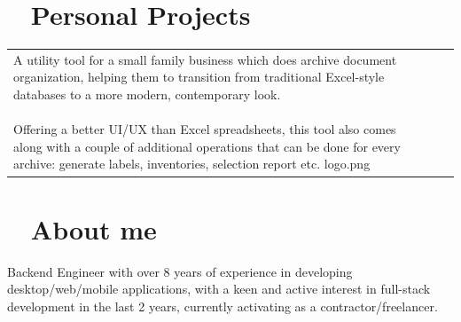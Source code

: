 \documentclass{modernsimplecv}
\newlength{\rightcolwidth}
\begin{document}
\begin{paracol}{2}
{\begin{minipage}[t]{\rightcolwidth}
        \end{minipage}
    
    }
        \switchcolumn
    
        \begin{minipage}[t]{\rightcolwidth}
            \small
            \section*{\faCode~ Personal Projects} 
            
            \begin{tabular}{p{3em} | p{} c}
                \personalproject{2023}{Archive Utilitary}{
                    \color{black!70}\footnotesize A utility tool for a small family business which does archive document organization, helping them to transition from traditional Excel-style databases to a more modern, contemporary look.\newline\newline
                    \color{black!70}\footnotesize Offering a better UI/UX than Excel spreadsheets, this tool also comes along with a couple of additional operations that can be done for every archive: generate labels, inventories, selection report etc.
                }{logo.png} \\
            \end{tabular}
        
        \end{minipage}
    
        \bigskip
    
        \begin{minipage}[t]{\rightcolwidth}
            \small
            \section*{\faInfo~ About me}
            
            Backend Engineer with over 8 years of experience in developing desktop/web/mobile applications, with a keen and active interest in full-stack development in the last 2 years, currently activating as a contractor/freelancer.
        \end{minipage}
    
        \bigskip
    
        \begin{minipage}[t]{\rightcolwidth}
            \small

\end{minipage}
\end{paracol}
\end{document}
